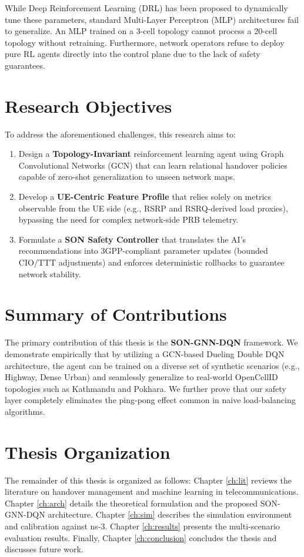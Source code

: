 \documentclass[12pt,a4paper,oneside]{report}
\begin{document}
While Deep Reinforcement Learning (DRL) has been proposed to dynamically tune these parameters, standard Multi-Layer Perceptron (MLP) architectures fail to generalize. An MLP trained on a 3-cell topology cannot process a 20-cell topology without retraining. Furthermore, network operators refuse to deploy pure RL agents directly into the control plane due to the lack of safety guarantees.

\section{Research Objectives}
To address the aforementioned challenges, this research aims to:
\begin{enumerate}
    \item Design a \textbf{Topology-Invariant} reinforcement learning agent using Graph Convolutional Networks (GCN) that can learn relational handover policies capable of zero-shot generalization to unseen network maps.
    \item Develop a \textbf{UE-Centric Feature Profile} that relies solely on metrics observable from the UE side (e.g., RSRP and RSRQ-derived load proxies), bypassing the need for complex network-side PRB telemetry.
    \item Formulate a \textbf{SON Safety Controller} that translates the AI's recommendations into 3GPP-compliant parameter updates (bounded CIO/TTT adjustments) and enforces deterministic rollbacks to guarantee network stability.
\end{enumerate}

\section{Summary of Contributions}
The primary contribution of this thesis is the \textbf{SON-GNN-DQN} framework. We demonstrate empirically that by utilizing a GCN-based Dueling Double DQN architecture, the agent can be trained on a diverse set of synthetic scenarios (e.g., Highway, Dense Urban) and seamlessly generalize to real-world OpenCellID topologies such as Kathmandu and Pokhara. We further prove that our safety layer completely eliminates the ping-pong effect common in naive load-balancing algorithms.

\section{Thesis Organization}
The remainder of this thesis is organized as follows: Chapter \ref{ch:lit} reviews the literature on handover management and machine learning in telecommunications. Chapter \ref{ch:arch} details the theoretical formulation and the proposed SON-GNN-DQN architecture. Chapter \ref{ch:sim} describes the simulation environment and calibration against ns-3. Chapter \ref{ch:results} presents the multi-scenario evaluation results. Finally, Chapter \ref{ch:conclusion} concludes the thesis and discusses future work.
\end{document}
